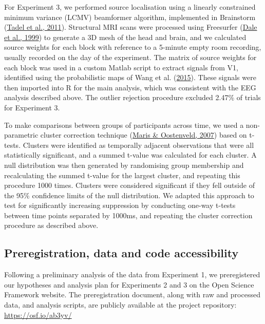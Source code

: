 \documentclass[
]{article}
\begin{document}
For Experiment 3, we performed source localisation using a linearly constrained minimum variance (LCMV) beamformer algorithm, implemented in Brainstorm (\protect\hyperlink{ref-Tadel2011}{Tadel et al., 2011}). Structural MRI scans were processed using Freesurfer (\protect\hyperlink{ref-Dale1999}{Dale et al., 1999}) to generate a 3D mesh of the head and brain, and we calculated source weights for each block with reference to a 5-minute empty room recording, usually recorded on the day of the experiment. The matrix of source weights for each block was used in a custom Matlab script to extract signals from V1, identified using the probabilistic maps of Wang et al. (\protect\hyperlink{ref-Wang2015}{2015}). These signals were then imported into R for the main analysis, which was consistent with the EEG analysis described above. The outlier rejection procedure excluded 2.47\% of trials for Experiment 3.

To make comparisons between groups of participants across time, we used a non-parametric cluster correction technique (\protect\hyperlink{ref-Maris2007}{Maris \& Oostenveld, 2007}) based on t-tests. Clusters were identified as temporally adjacent observations that were all statistically significant, and a summed t-value was calculated for each cluster. A null distribution was then generated by randomising group membership and recalculating the summed t-value for the largest cluster, and repeating this procedure 1000 times. Clusters were considered significant if they fell outside of the 95\% confidence limits of the null distribution. We adapted this approach to test for significantly increasing suppression by conducting one-way t-tests between time points separated by 1000ms, and repeating the cluster correction procedure as described above.

\hypertarget{preregistration-data-and-code-accessibility}{%
\subsection{Preregistration, data and code accessibility}\label{preregistration-data-and-code-accessibility}}

Following a preliminary analysis of the data from Experiment 1, we preregistered our hypotheses and analysis plan for Experiments 2 and 3 on the Open Science Framework website. The preregistration document, along with raw and processed data, and analysis scripts, are publicly available at the project repository: \url{https://osf.io/ab3yv/}
\end{document}
